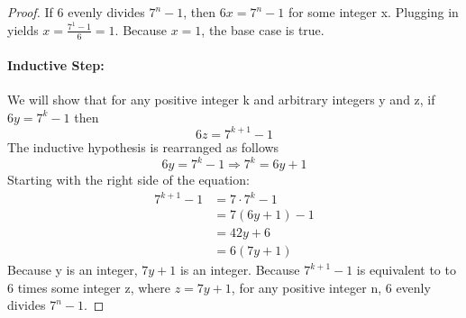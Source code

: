 \documentclass[11pt, letterpaper, twocolumn, fleqn]{article}
\begin{document}
\begin{enumerate}
\begin{proof}
            If 6 evenly divides $7^{n}-1$, then $6x = 7^{n}-1$ for some integer x. Plugging in yields $x = \frac{7^{1}-1}{6} = 1$.  Because $x = 1$, the base case is true.
            \item \paragraph{Inductive Step:} We will show that for any positive integer k and arbitrary integers y and z, if $6y = 7^{k}-1$ then 
              $$6z = 7^{k+1}-1$$
            The inductive hypothesis is rearranged as follows 
              $$6y = 7^{k}-1  \Rightarrow 7^{k} = 6y+1$$
            Starting with the right side of the equation:
            \begin{align*}
              7^{k+1}-1 &= 7\cdot7^{k}-1 \\
              &= 7(6y+1) - 1 \tag{inductive hypothesis} \\
              &= 42y+6 \\
              &= 6(7y+1)
            \end{align*}
            Because y is an integer, $7y+1$ is an integer. Because $7^{k+1}-1$ is equivalent to to 6 times some integer z, where $z=7y+1$, for any positive integer n, 6 evenly divides $7^{n}-1$.
          \end{proof}
        \end{enumerate}
    
\end{document}
